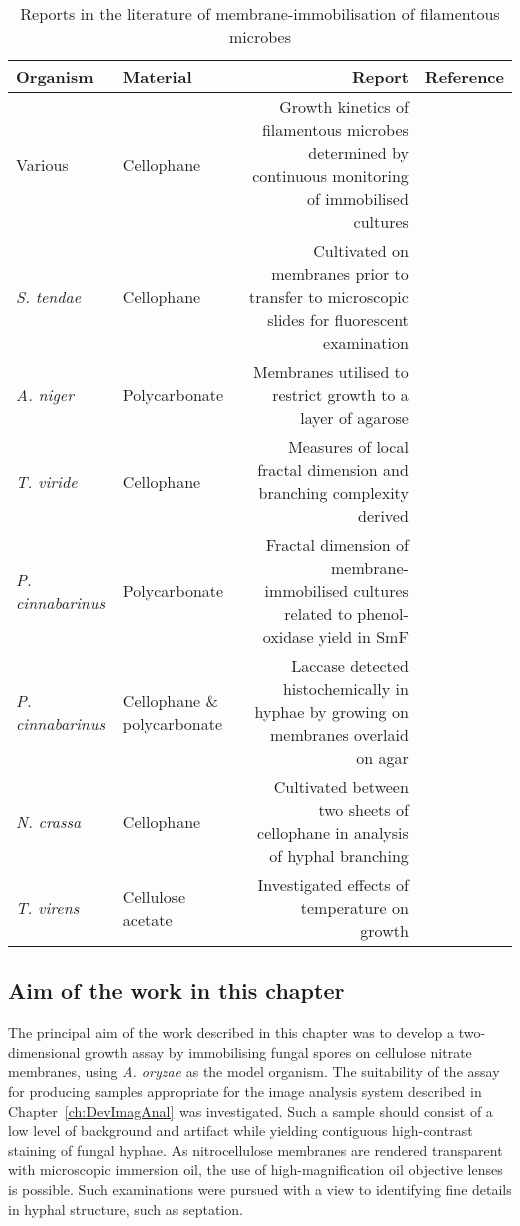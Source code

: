 \begin{table}[htbp]
	\centering
	\footnotesize
	\caption{Reports in the literature of membrane-immobilisation of filamentous microbes}
	\label{tab:MembraneLit}
	\begin{tabularx}{(\textwidth - 1cm)}{l P R c}
		\toprule
		Organism & Material & Report & Reference \\ \midrule
		Various & Cellophane & Growth kinetics of filamentous microbes determined by continuous monitoring of immobilised cultures & \cite{trinci1974}\\
		\emph{S. tendae} & Cellophane & Cultivated on membranes prior to transfer to microscopic slides for fluorescent examination  & \cite{reichl1990}\\
		\emph{A. niger} & Polycarbonate & Membranes utilised to restrict growth to a layer of agarose & \cite{wosten1991}\\
		\emph{T. viride} & Cellophane & Measures of local fractal dimension and branching complexity derived & \cite{hitchcock1996}\\
		\emph{P. cinnabarinus} & Polycarbonate & Fractal dimension of membrane-immobilised cultures related to phenol-oxidase yield in SmF & \cite{jones1997}\\
		\emph{P. cinnabarinus} & Cellophane \& polycarbonate & Laccase detected histochemically in hyphae by growing on membranes overlaid on agar & \cite{jones1999}\\
		\emph{N. crassa} & Cellophane & Cultivated between two sheets of cellophane in analysis of hyphal branching & \cite{sone1999}\\
		\emph{T. virens} & Cellulose acetate & Investigated effects of temperature on growth & \cite{cross2004}\\
		\bottomrule
	\end{tabularx}
\end{table}

\subsection{Aim of the work in this chapter}

The principal aim of the work described in this chapter was to develop a two-dimensional growth assay by immobilising fungal spores on cellulose nitrate membranes, using \emph{A. oryzae} as the model organism. The suitability of the assay for producing samples appropriate for the image analysis system described in Chapter~\ref{ch:DevImagAnal} was investigated. Such a sample should consist of a low level of background and artifact while yielding contiguous high-contrast staining of fungal hyphae. As nitrocellulose membranes are rendered transparent with microscopic immersion oil, the use of high-magnification oil objective lenses is possible. Such examinations were pursued with a view to identifying fine details in hyphal structure, such as septation.

